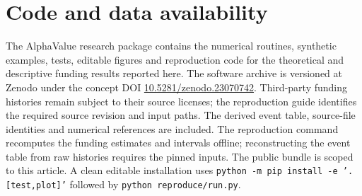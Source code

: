 \documentclass[11pt]{article}
\numberwithin{equation}{section}
\theoremstyle{plain}
\theoremstyle{definition}
\theoremstyle{remark}
\begin{document}
\section{Code and data availability}\label{code-and-data-availability}

The AlphaValue research package contains the numerical routines, synthetic examples, tests, editable figures and reproduction code for the theoretical and descriptive funding results reported here. The software archive is versioned at Zenodo under the concept DOI
\href{https://doi.org/10.5281/zenodo.23070742}{10.5281/zenodo.23070742}. Third-party funding histories remain subject to their source licenses; the reproduction guide identifies the required source revision and input paths. The derived event table, source-file identities and numerical references are included. The reproduction command recomputes the funding estimates and intervals offline; reconstructing the event table from raw histories requires the pinned inputs. The public bundle is scoped to this article. A clean editable installation uses \texttt{python -m pip install -e '.[test,plot]'} followed by \texttt{python reproduce/run.py}.
\end{document}
